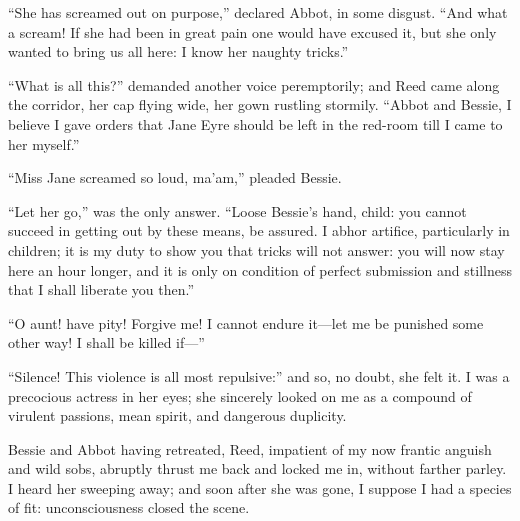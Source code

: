 \enquote{She has screamed out on purpose,} declared Abbot, in some
disgust.  \enquote{And what a scream!  If she had been in great pain one
	would have excused it, but she only wanted to bring us all here: I know
	her naughty tricks.}

\enquote{What is all this?} demanded another voice peremptorily; and
\Mrs{} Reed came along the corridor, her cap flying wide, her gown
rustling stormily.  \enquote{Abbot and Bessie, I believe I gave orders
	that Jane Eyre should be left in the red-room till I came to her
	myself.}

\enquote{Miss Jane screamed so loud, ma'am,} pleaded Bessie.

\enquote{Let her go,} was the only answer.  \enquote{Loose Bessie's
	hand, child: you cannot succeed in getting out by these means, be
	assured.  I abhor artifice, particularly in children; it is my duty to
	show you that tricks will not answer: you will now stay here an hour
	longer, and it is only on condition of perfect submission and stillness
	that I shall liberate you then.}

\enquote{O aunt! have pity!  Forgive me!  I cannot endure it---let me be
	punished some other way!  I shall be killed if---}

\enquote{Silence!  This violence is all most repulsive:} and so, no
doubt, she felt it.  I was a precocious actress in her eyes; she
sincerely looked on me as a compound of virulent passions, mean spirit,
and dangerous duplicity.

Bessie and Abbot having retreated, \Mrs{} Reed, impatient of my now
frantic anguish and wild sobs, abruptly thrust me back and locked me in,
without farther parley.  I heard her sweeping away; and soon after she
was gone, I suppose I had a species of fit: unconsciousness closed the
scene.
